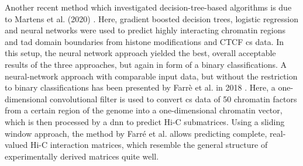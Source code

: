 Another recent method which investigated decision-tree-based algorithms is due to Martens et al. (2020) \cite{Martens2020}.
Here, gradient boosted decision trees, logistic regression and neural networks were used to predict highly interacting chromatin regions
and \acrshort{tad} domain boundaries from histone modifications and CTCF \acrshort{cs} data. 
In this setup, the neural network approach yielded the best, overall acceptable results of the three approaches,
but again in form of a binary classifications.
A neural-network approach with comparable input data, but without the restriction to binary classifications has been presented by Farr\`e et al. in 2018 \cite{Farre2018a}. 
Here, a one-dimensional convolutional filter is used to convert \acrshort{cs} data of 50 chromatin factors from a certain region of the genome into a 
one-dimensional chromatin vector, which is then processed by a \acrfull{dnn} to predict Hi-C submatrices.
Using a sliding window approach, the method by Farr\'e et al. allows predicting complete, real-valued Hi-C interaction matrices, 
which resemble the general structure of experimentally derived matrices quite well.

